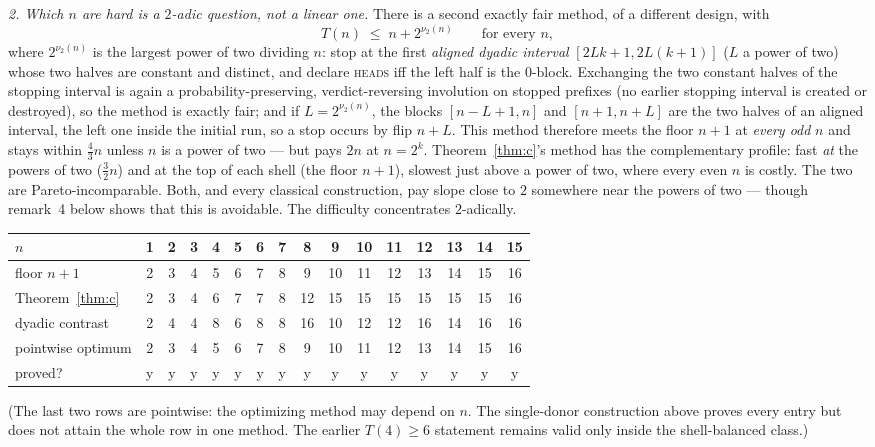 \documentclass[11pt]{article}
\theoremstyle{remark}
\newcommand{\head}{\textnormal{\textsc{heads}}}
\begin{document}
\emph{2. Which $n$ are hard is a $2$-adic question, not a linear one.}
There is a second exactly fair method, of a different design, with
\[
T(n)\;\le\;n+2^{\nu_2(n)}\qquad\text{for every } n ,
\]
where $2^{\nu_2(n)}$ is the largest power of two dividing $n$: stop at the
first \emph{aligned dyadic interval} $[2Lk+1,2L(k+1)]$ ($L$ a power of two)
whose two halves are constant and distinct, and declare \head{} iff the left
half is the $0$-block. Exchanging the two constant halves of the stopping
interval is again a probability-preserving, verdict-reversing involution on
stopped prefixes (no earlier stopping interval is created or destroyed), so
the method is exactly fair; and if $L=2^{\nu_2(n)}$, the blocks
$[n-L+1,n]$ and $[n+1,n+L]$ are the two halves of an aligned interval, the
left one inside the initial run, so a stop occurs by flip $n+L$. This method
therefore meets the floor $n+1$ at \emph{every odd} $n$ and stays within
$\tfrac43n$ unless $n$ is a power of two --- but pays $2n$ at $n=2^k$.
Theorem~\ref{thm:c}'s method has the complementary profile: fast \emph{at}
the powers of two ($\tfrac32n$) and at the top of each shell (the floor
$n+1$), slowest just above a power of two, where every even $n$ is costly.
The two are Pareto-incomparable. Both, and every classical construction,
pay slope close to $2$ somewhere near the powers of two --- though remark~4
below shows that this is avoidable. The difficulty concentrates
$2$-adically.
\begin{center}
\begin{tabular}{lccccccccccccccc}
\toprule
$n$ & 1 & 2 & 3 & 4 & 5 & 6 & 7 & 8 & 9 & 10 & 11 & 12 & 13 & 14 & 15\\
\midrule
floor $n+1$          & 2 & 3 & 4 & 5 & 6 & 7 & 8 & 9 & 10 & 11 & 12 & 13 & 14 & 15 & 16\\
Theorem~\ref{thm:c}  & 2 & 3 & 4 & 6 & 7 & 7 & 8 & 12 & 15 & 15 & 15 & 15 & 15 & 15 & 16\\
dyadic contrast      & 2 & 4 & 4 & 8 & 6 & 8 & 8 & 16 & 10 & 12 & 12 & 16 & 14 & 16 & 16\\
pointwise optimum    & 2 & 3 & 4 & 5 & 6 & 7 & 8 & 9 & 10 & 11 & 12 & 13 & 14 & 15 & 16\\
proved?              & y & y & y & y & y & y & y & y & y & y & y & y & y & y & y\\
\bottomrule
\end{tabular}
\end{center}
(The last two rows are pointwise: the optimizing method may depend on $n$.
The single-donor construction above proves every entry but does not attain
the whole row in one method.  The earlier $T(4)\ge6$ statement remains valid
only inside the shell-balanced class.)
\end{document}
